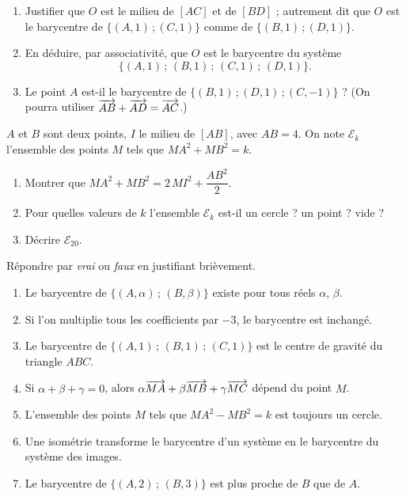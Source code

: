 \begin{enumerate}
	\item Justifier que $O$ est le milieu de $[AC]$ et de $[BD]$ ; autrement dit
	que $O$ est le barycentre de $\{(A,1)\,;(C,1)\}$ comme de $\{(B,1)\,;(D,1)\}$.
	\item En déduire, par associativité, que $O$ est le barycentre du système
	$$\{(A,1)\,;\,(B,1)\,;\,(C,1)\,;\,(D,1)\}.$$
	\item Le point $A$ est-il le barycentre de $\{(B,1)\,;(D,1)\,;(C,-1)\}$ ?
	(On pourra utiliser $\overrightarrow{AB}+\overrightarrow{AD}=\overrightarrow{AC}$.)
\end{enumerate}

$A$ et $B$ sont deux points, $I$ le milieu de $[AB]$, avec $AB = 4$. On note
$\mathscr{E}_k$ l'ensemble des points $M$ tels que $MA^2 + MB^2 = k$.

\begin{center}
\end{center}

\begin{enumerate}
	\item Montrer que $MA^2 + MB^2 = 2\,MI^2 + \dfrac{AB^2}{2}$.
	\item Pour quelles valeurs de $k$ l'ensemble $\mathscr{E}_k$ est-il un
	cercle ? un point ? vide ?
	\item Décrire $\mathscr{E}_{20}$.
\end{enumerate}

Répondre par \emph{vrai} ou \emph{faux} en justifiant brièvement.
\begin{enumerate}
	\item Le barycentre de $\{(A,\alpha)\,;\,(B,\beta)\}$ existe pour tous réels
	$\alpha$, $\beta$.
	\item Si l'on multiplie tous les coefficients par $-3$, le barycentre est
	inchangé.
	\item Le barycentre de $\{(A,1)\,;\,(B,1)\,;\,(C,1)\}$ est le centre de
	gravité du triangle $ABC$.
	\item Si $\alpha + \beta + \gamma = 0$, alors $\alpha\overrightarrow{MA} + \beta\overrightarrow{MB}
	+ \gamma\overrightarrow{MC}$ dépend du point $M$.
	\item L'ensemble des points $M$ tels que $MA^2 - MB^2 = k$ est toujours un
	cercle.
	\item Une isométrie transforme le barycentre d'un système en le barycentre
	du système des images.
	\item Le barycentre de $\{(A,2)\,;\,(B,3)\}$ est plus proche de $B$ que de $A$.
\end{enumerate}

